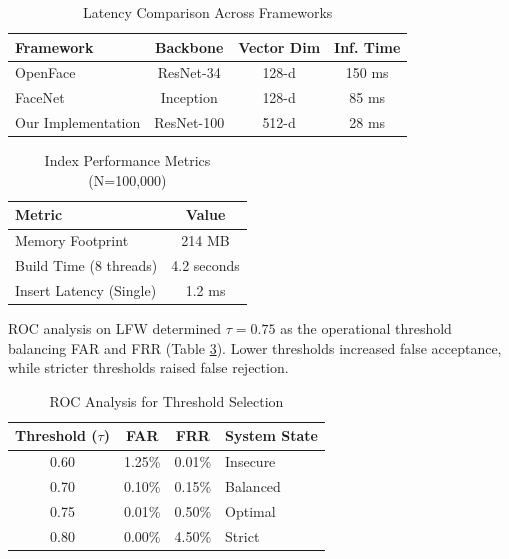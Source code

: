 \documentclass[conference]{IEEEtran}
\begin{document}
\begin{table}[htbp]
\caption{Latency Comparison Across Frameworks}
\begin{center}
\begin{tabular}{|l|c|c|c|}
\hline
Framework & Backbone & Vector Dim & Inf. Time \\
\hline
OpenFace \cite{b17} & ResNet-34 & 128-d & 150 ms \\
\hline
FaceNet \cite{b18} & Inception & 128-d & 85 ms \\
\hline
Our Implementation & ResNet-100 & 512-d & 28 ms \\
\hline
\end{tabular}
\label{tab_compare}
\end{center}
\end{table}

\begin{table}[htbp]
\caption{Index Performance Metrics (N=100,000)}
\begin{center}
\begin{tabular}{|l|c|}
\hline
Metric & Value \\
\hline
Memory Footprint & 214 MB \\
\hline
Build Time (8 threads) & 4.2 seconds \\
\hline
Insert Latency (Single) & 1.2 ms \\
\hline
\end{tabular}
\end{center}
\label{tab_index_metrics}
\end{table}

ROC analysis on LFW determined $\tau = 0.75$ as the operational threshold balancing FAR and FRR (Table \ref{tab_roc}). Lower thresholds increased false acceptance, while stricter thresholds raised false rejection.

\begin{table}[htbp]
\caption{ROC Analysis for Threshold Selection}
\begin{center}
\begin{tabular}{|c|c|c|l|}
\hline
Threshold ($\tau$) & FAR & FRR & System State \\
\hline
0.60 & 1.25\% & 0.01\% & Insecure \\
\hline
0.70 & 0.10\% & 0.15\% & Balanced \\
\hline
0.75 & 0.01\% & 0.50\% & Optimal \\
\hline
0.80 & 0.00\% & 4.50\% & Strict \\
\hline
\end{tabular}
\label{tab_roc}
\end{center}
\end{table}
\end{document}
